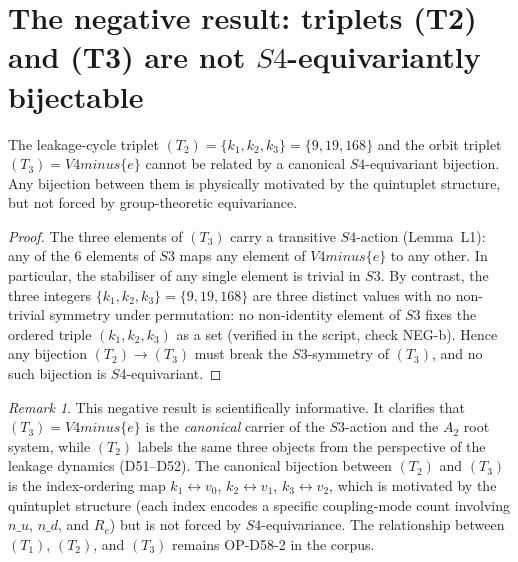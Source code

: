 \documentclass[11pt,a4paper]{article}
\def\Sfour{S4}%
\def\Vfour{V4}%
\def\Sthree{S3}%
\def\Re{Re}%
\def\setminus{ minus }%
\def\nuu{n\_u}%
\def\ndd{n\_d}%
\newenvironment{negativebox}[1][]{%
  \begin{tcolorbox}[negativestyle,title={Negative Result\ifx\relax#1\relax\else: #1\fi}]}{\end{tcolorbox}}
\theoremstyle{plain}
\theoremstyle{definition}
\theoremstyle{remark}
\newtheorem{remark}[theorem]{Remark}
\newcommand{\Sfour}{S_4}
\newcommand{\Vfour}{V_4}
\newcommand{\Sthree}{S_3}
\renewcommand{\Re}{R_e}
\newcommand{\nuu}{n_u}
\newcommand{\ndd}{n_d}
\newcommand{\kone}{k_1}
\newcommand{\ktwo}{k_2}
\newcommand{\kthree}{k_3}
\begin{document}
\section{The negative result: triplets (T2) and (T3) are not \texorpdfstring{$\Sfour$}{S4}-equivariantly bijectable}
\label{sec:negative}

\begin{negativebox}[NEG --- The bijection $(T_2) \leftrightarrow (T_3)$ is not $\Sfour$-equivariant]
\label{neg:T2T3}
The leakage-cycle triplet $(T_2) = \{\kone, \ktwo, \kthree\} = \{9, 19, 168\}$ and the orbit triplet $(T_3) = \Vfour \setminus \{e\}$ cannot be related by a canonical $\Sfour$-equivariant bijection. Any bijection between them is physically motivated by the quintuplet structure, but not forced by group-theoretic equivariance.
\end{negativebox}

\begin{proof}
The three elements of $(T_3)$ carry a transitive $\Sfour$-action (Lemma~L1): any of the 6 elements of $\Sthree$ maps any element of $\Vfour\setminus\{e\}$ to any other. In particular, the stabiliser of any single element is trivial in $\Sthree$. By contrast, the three integers $\{\kone, \ktwo, \kthree\} = \{9, 19, 168\}$ are three distinct values with no non-trivial symmetry under permutation: no non-identity element of $\Sthree$ fixes the ordered triple $(\kone, \ktwo, \kthree)$ as a set (verified in the script, check NEG-b). Hence any bijection $(T_2) \to (T_3)$ must break the $\Sthree$-symmetry of $(T_3)$, and no such bijection is $\Sfour$-equivariant.
\end{proof}

\begin{remark}
This negative result is scientifically informative. It clarifies that $(T_3) = \Vfour\setminus\{e\}$ is the \emph{canonical} carrier of the $\Sthree$-action and the $A_2$ root system, while $(T_2)$ labels the same three objects from the perspective of the leakage dynamics (D51--D52). The canonical bijection between $(T_2)$ and $(T_3)$ is the index-ordering map $\kone \leftrightarrow v_0$, $\ktwo \leftrightarrow v_1$, $\kthree \leftrightarrow v_2$, which is motivated by the quintuplet structure (each index encodes a specific coupling-mode count involving $\nuu$, $\ndd$, and $\Re$) but is not forced by $\Sfour$-equivariance. The relationship between $(T_1)$, $(T_2)$, and $(T_3)$ remains OP-D58-2 in the corpus.
\end{remark}
\end{document}
